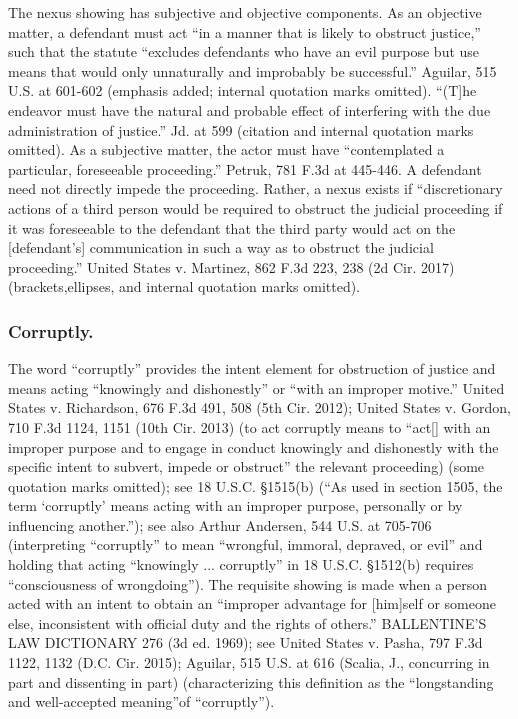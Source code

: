 The nexus showing has subjective and objective components.
As an objective matter, a defendant must act “in a manner that is likely to obstruct justice,” such that the statute “excludes defendants who have an evil purpose but use means that would only unnaturally and improbably be successful.”
Aguilar, 515 U.S. at 601-602 (emphasis added; internal quotation marks omitted).
“(T]he endeavor must have the natural and probable effect of interfering with the due administration of justice.”
Jd. at 599 (citation and internal quotation marks omitted).
As a subjective matter, the actor must have “contemplated a particular, foreseeable proceeding.”
Petruk, 781 F.3d at 445-446.
A defendant need not directly impede the proceeding.
Rather, a nexus exists if “discretionary actions of a third person would be required to obstruct the judicial proceeding if it was foreseeable to the defendant that the third party would act on the [defendant’s] communication in such a way as to obstruct the judicial proceeding.”
United States v. Martinez, 862 F.3d 223, 238 (2d Cir. 2017) (brackets,ellipses, and internal quotation marks omitted).

\subsubsection*{Corruptly.}
The word “corruptly” provides the intent element for obstruction of justice and means acting “knowingly and dishonestly” or “with an improper motive.”
United States v. Richardson, 676 F.3d 491, 508 (5th Cir. 2012);
United States v. Gordon, 710 F.3d 1124, 1151 (10th Cir. 2013) (to act corruptly means to “act[] with an improper purpose and to engage in conduct knowingly and dishonestly with the specific intent to subvert, impede or obstruct” the relevant proceeding) (some quotation marks omitted);
see 18 U.S.C. \S 1515(b) (“As used in section 1505, the term ‘corruptly’ means acting with an improper purpose, personally or by influencing another.”);
see also Arthur Andersen, 544 U.S. at 705-706 (interpreting “corruptly” to mean “wrongful, immoral, depraved, or evil” and holding that acting “knowingly ... corruptly” in 18 U.S.C. \S 1512(b) requires “consciousness of wrongdoing”).
The requisite showing is made when a person acted with an intent to obtain an “improper advantage for [him]self or someone else, inconsistent with official duty and the rights of others.”
BALLENTINE’S LAW DICTIONARY 276 (3d ed. 1969);
see United States v. Pasha, 797 F.3d 1122, 1132 (D.C. Cir. 2015);
Aguilar, 515 U.S. at 616 (Scalia, J., concurring in part and dissenting in part) (characterizing this definition as the “longstanding and well-accepted meaning”of “corruptly”).

